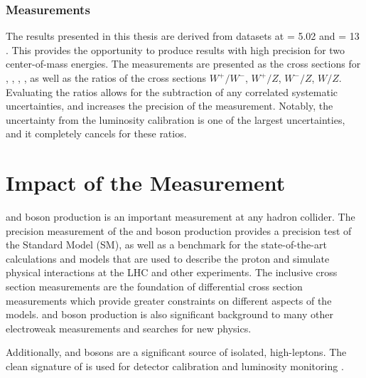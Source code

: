 \subsubsection{Measurements}
The results presented in this thesis are derived from datasets at \s = 5.02 \TeV and \s = 13 \TeV. This provides the opportunity to produce results with high precision for two center-of-mass energies. The measurements are presented as the cross sections for \Wp, \Wm, \W, \Z, as well as the ratios of the cross sections $W^+/W^-$, $W^+/Z$, $W^-/Z$, $W/Z$. Evaluating the ratios allows for the subtraction of any correlated systematic uncertainties, and increases the precision of the measurement. Notably, the uncertainty from the luminosity calibration is one of the largest uncertainties, and it completely cancels for these ratios. 


\section{Impact of the Measurement}
\W and \Z boson production is an important measurement at any hadron collider. The precision measurement of the \W and \Z boson production provides a precision test of the Standard Model (SM), as well as a benchmark for the state-of-the-art calculations and models that are used to describe the proton and simulate physical interactions at the LHC and other experiments. The inclusive cross section measurements are the foundation of differential cross section measurements which provide greater constraints on different aspects of the models.  \W and \Z boson production is also significant background to many other electroweak measurements and searches for new physics.

Additionally, \W and \Z bosons are a significant source of isolated, high-\pt leptons. The clean signature of \zll is used for detector calibration and luminosity monitoring \cite{xinmei}.
